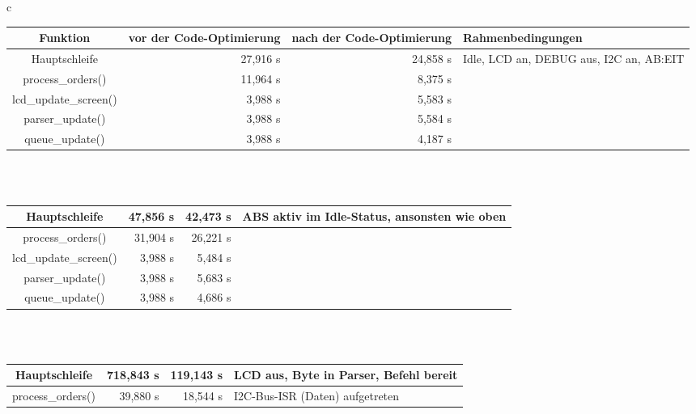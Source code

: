 \begin{table}[htb]
\begin{center}
	\begin{tabular}{c}
	\begin{tabularx}{\textwidth}{|c||R|R|X|}
		\hline
		\textbf{Funktion}     & \textbf{vor der Code-Optimierung} & \textbf{nach der Code-Optimierung} & \textbf{Rahmen\-bedingungen} \\ 
		\hline \hline
		Hauptschleife         & 27,916 \textmu{}s      & 24,858 \textmu{}s       & Idle, LCD an, DEBUG aus, I2C an, AB:EIT \\ \hline
		process\_orders()     & 11,964 \textmu{}s      &  8,375 \textmu{}s       & \\ \hline
		lcd\_update\_screen() &  3,988 \textmu{}s      &  5,583 \textmu{}s       & \\ \hline
		parser\_update()      &  3,988 \textmu{}s      &  5,584 \textmu{}s       & \\ \hline
		queue\_update()       &  3,988 \textmu{}s      &  4,187 \textmu{}s       & \\ \hline
	\end{tabularx} \\
	\\
	\begin{tabularx}{\textwidth}{|c||R|R|X|}
		\hline
		Hauptschleife         & 47,856 \textmu{}s      & 42,473 \textmu{}s       & ABS aktiv im Idle-Status, ansonsten wie oben \\ \hline
		process\_orders()     & 31,904 \textmu{}s      & 26,221 \textmu{}s       & \\ \hline
		lcd\_update\_screen() &  3,988 \textmu{}s      &  5,484 \textmu{}s       & \\ \hline
		parser\_update()      &  3,988 \textmu{}s      &  5,683 \textmu{}s       & \\ \hline
		queue\_update()       &  3,988 \textmu{}s      &  4,686 \textmu{}s       & \\ \hline
	\end{tabularx} \\
	\\
	\begin{tabularx}{\textwidth}{|c||R|R|X|}
		\hline
		Hauptschleife         & 718,843 \textmu{}s     & 119,143 \textmu{}s      & LCD aus, Byte in Parser, Befehl bereit \\ \hline
		process\_orders()     &  39,880 \textmu{}s     &  18,544 \textmu{}s      & I2C-Bus-ISR (Daten) aufgetreten \\ \hline

\end{tabularx}
\end{tabular}
\end{center}
\end{table}

